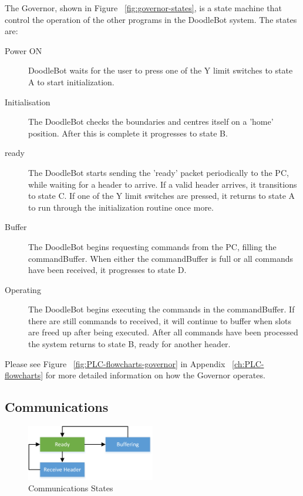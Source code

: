 		The Governor, shown in Figure ~\ref{fig:governor-states}, is a state machine that control the operation of the other programs in the DoodleBot system. The states are:
		
		\begin{description}
			\item[Power ON] DoodleBot waits for the user to press one of the Y limit switches to state A to start initialization.
			\item[Initialisation] The DoodleBot checks the boundaries and centres itself on a 'home' position. After this is complete it progresses to state B.
			\item[ready] The DoodleBot starts sending the 'ready' packet periodically to the PC, while waiting for a header to arrive. If a valid header arrives, it transitions to state C. If one of the Y limit switches are pressed, it returns to state A to run through the initialization routine once more.
			\item[Buffer] The DoodleBot begins requesting commands from the PC, filling the commandBuffer. When either the commandBuffer is full or all commands have been received, it progresses to state D.
			\item[Operating] The DoodleBot begins executing the commands in the commandBuffer. If there are still commands to received, it will continue to buffer when slots are freed up after being executed. After all commands have been processed the system returns to state B, ready for another header.
		\end{description}
		
		Please see Figure ~\ref{fig:PLC-flowcharts-governor} in Appendix ~\ref{ch:PLC-flowcharts} for more detailed information on how the Governor operates.

\subsection{Communications}
	
			\begin{figure}[h]
				\centering
				\includegraphics[width=0.5\textwidth]{figures/cncMachine/communications_simple.png}
				\caption{Communications States}
				\label{fig:comms-states}
			\end{figure}
	
